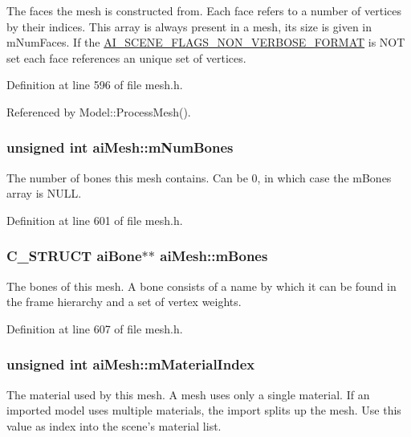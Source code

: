 The faces the mesh is constructed from. Each face refers to a number of vertices by their indices. This array is always present in a mesh, its size is given in mNumFaces. If the \hyperlink{scene_8h_e17f4a0adb51e554db9575cc4e1126f9}{AI\_\-SCENE\_\-FLAGS\_\-NON\_\-VERBOSE\_\-FORMAT} is NOT set each face references an unique set of vertices. 

Definition at line 596 of file mesh.h.

Referenced by Model::ProcessMesh().\hypertarget{structai_mesh_0f9d5425b6300e32a842a94f943fd79e}{
\subsubsection[mNumBones]{\setlength{\rightskip}{0pt plus 5cm}unsigned int {\bf aiMesh::mNumBones}}}
\label{structai_mesh_0f9d5425b6300e32a842a94f943fd79e}


The number of bones this mesh contains. Can be 0, in which case the mBones array is NULL. 

Definition at line 601 of file mesh.h.\hypertarget{structai_mesh_0c0582a7f45b340b6a33552c53232539}{
\subsubsection[mBones]{\setlength{\rightskip}{0pt plus 5cm}C\_\-STRUCT {\bf aiBone}$\ast$$\ast$ {\bf aiMesh::mBones}}}
\label{structai_mesh_0c0582a7f45b340b6a33552c53232539}


The bones of this mesh. A bone consists of a name by which it can be found in the frame hierarchy and a set of vertex weights. 

Definition at line 607 of file mesh.h.\hypertarget{structai_mesh_a2807c7ba172115203ed16047ad65f9e}{
\subsubsection[mMaterialIndex]{\setlength{\rightskip}{0pt plus 5cm}unsigned int {\bf aiMesh::mMaterialIndex}}}
\label{structai_mesh_a2807c7ba172115203ed16047ad65f9e}


The material used by this mesh. A mesh uses only a single material. If an imported model uses multiple materials, the import splits up the mesh. Use this value as index into the scene's material list. 

